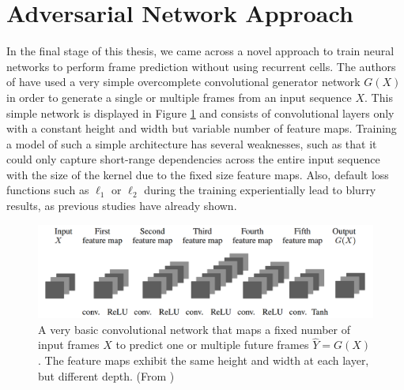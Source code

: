 \section{Adversarial Network Approach}

In the final stage of this thesis, we came across a novel approach to train neural networks to perform frame prediction without using recurrent cells. The authors of \parencite{deep_multiscale_video_pred} have used a very simple overcomplete convolutional generator network $ G(X) $ in order to generate a single or multiple frames from an input sequence $ X $. This simple network is displayed in Figure \ref{fig:gan_generator} and consists of convolutional layers only with a constant height and width but variable number of feature maps. Training a model of such a simple architecture has several weaknesses, such as that it could only capture short-range dependencies across the entire input sequence with the size of the kernel due to the fixed size feature maps. Also, default loss functions such as $\ell_1$ or $\ell_2$ during the training experientially lead to blurry results, as previous studies have already shown.

\begin{figure}[htb]
	\centering
	\includegraphics[width=0.8\linewidth]{figures/related/deep_multiscale_generator.png} 
	\caption[Convolutional Autoencoder for Future Generation]{A very basic convolutional network that maps a fixed number of input frames $X$ to predict one or multiple future frames $\hat{Y} = G(X)$. The feature maps exhibit the same height and width at each layer, but different depth. (From \parencite{deep_multiscale_video_pred})} \label{fig:gan_generator}
\end{figure}

